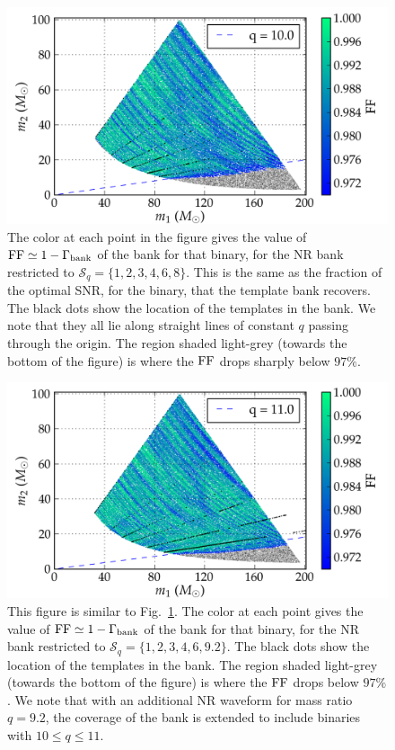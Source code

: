 \begin{figure}
\centering
\includegraphics[width=\columnwidth]{bank002_01_01_mtot200_match_cropped.png}
\caption{The color at each point in the figure gives the
value of $\mathrm{FF}\simeq 1-\Gamma_{\mathrm{bank}}$ of the bank for that binary, for
the NR bank restricted to $\mathcal{S}_q=\{1,2,3,4,6,8\}$. This is the
same as the fraction of the optimal SNR, for the binary, that the
template bank recovers. The black dots show
the location of the templates in the bank. We note that they all lie
along straight lines of constant $q$ passing through the origin. The region 
shaded light-grey (towards the bottom of the figure) is where the $\mathrm{FF}$ 
drops sharply below $97\%$.}
\label{fig:bank001_01_match}
\end{figure}
\begin{figure}
\centering
\includegraphics[width=\columnwidth]{bank006_01_mtot200_match_cropped.png}
\caption{This figure is similar to Fig.~\ref{fig:bank001_01_match}.
The color at each point gives the value of 
$\mathrm{FF}\simeq 1-\Gamma_{\mathrm{bank}}$ of the bank for that binary, for
the NR bank restricted to $\mathcal{S}_q=\{1,2,3,4,6,9.2\}$.
The black dots show the location of the templates in the bank. 
The region shaded light-grey (towards the bottom of the figure) is 
where the $\mathrm{FF}$ drops below $97\%$. We note that with an additional
NR waveform for mass ratio $q=9.2$, the coverage of the bank is 
extended to include binaries with $10\leq q\leq 11$.}
\label{fig:bank006_01_match}
\end{figure}
